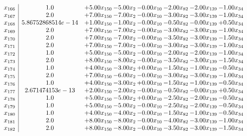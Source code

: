 \documentclass[8pt]{article}
\begin{document}
\[\begin{array}{c| c c@{\hskip 2pt} c@{\hskip 2pt} c@{\hskip 2pt} c@{\hskip 2pt} c@{\hskip 2pt} c@{\hskip 2pt} }
 x_{166}   &  1.0 & +  5.00 x_{150} & -5.00 x_{2} & -0.00 x_{10} & -2.00 x_{82} & -2.00 x_{139} & -1.00 x_{34}\\
 x_{167}   &  2.0 & +  7.00 x_{150} & -7.00 x_{2} & -0.00 x_{10} & -3.00 x_{82} & -3.00 x_{139} & -1.00 x_{34}\\
 x_{168}   &  5.86752868514e-14 & +  1.00 x_{150} & -1.00 x_{2} & -0.00 x_{10} & -0.50 x_{82} & -0.00 x_{139} & +  0.50 x_{34}\\
 x_{169}   &  2.0 & +  7.00 x_{150} & -7.00 x_{2} & -0.00 x_{10} & -3.00 x_{82} & -3.00 x_{139} & -1.00 x_{34}\\
 x_{170}   &  2.0 & +  7.00 x_{150} & -7.00 x_{2} & -0.00 x_{10} & -3.50 x_{82} & -3.00 x_{139} & -1.50 x_{34}\\
 x_{171}   &  2.0 & +  7.00 x_{150} & -7.00 x_{2} & -0.00 x_{10} & -3.00 x_{82} & -3.00 x_{139} & -1.00 x_{34}\\
 x_{172}   &  1.0 & +  5.00 x_{150} & -5.00 x_{2} & -0.00 x_{10} & -2.00 x_{82} & -2.00 x_{139} & -1.00 x_{34}\\
 x_{173}   &  2.0 & +  8.00 x_{150} & -8.00 x_{2} & -0.00 x_{10} & -3.50 x_{82} & -3.00 x_{139} & -1.50 x_{34}\\
 x_{174}   &  1.0 & +  4.00 x_{150} & -3.00 x_{2} & +  0.00 x_{10} & -1.50 x_{82} & -1.00 x_{139} & -0.50 x_{34}\\
 x_{175}   &  2.0 & +  7.00 x_{150} & -6.00 x_{2} & -0.00 x_{10} & -3.00 x_{82} & -3.00 x_{139} & -1.00 x_{34}\\
 x_{176}   &  1.0 & +  4.00 x_{150} & -3.00 x_{2} & +  0.00 x_{10} & -1.50 x_{82} & -1.00 x_{139} & -0.50 x_{34}\\
 x_{177}   &  2.671474153e-13 & +  2.00 x_{150} & -2.00 x_{2} & -0.00 x_{10} & -0.50 x_{82} & -0.00 x_{139} & +  0.50 x_{34}\\
 x_{178}   &  1.0 & +  5.00 x_{150} & -5.00 x_{2} & +  0.00 x_{10} & -2.50 x_{82} & -2.00 x_{139} & -0.50 x_{34}\\
 x_{179}   &  1.0 & +  5.00 x_{150} & -5.00 x_{2} & -0.00 x_{10} & -2.50 x_{82} & -2.00 x_{139} & -0.50 x_{34}\\
 x_{180}   &  1.0 & +  4.00 x_{150} & -4.00 x_{2} & -0.00 x_{10} & -1.50 x_{82} & -1.00 x_{139} & -0.50 x_{34}\\
 x_{181}   &  2.0 & +  8.00 x_{150} & -8.00 x_{2} & -0.00 x_{10} & -4.00 x_{82} & -3.00 x_{139} & -1.00 x_{34}\\
 x_{182}   &  2.0 & +  8.00 x_{150} & -8.00 x_{2} & -0.00 x_{10} & -3.50 x_{82} & -3.00 x_{139} & -1.50 x_{34}\\

\end{array}\]
\end{document}
